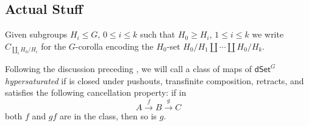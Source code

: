 \documentclass[a4paper,10pt,draft]{article}%
\numberwithin{equation}{section}%
\begin{document}

\subsection{Actual Stuff}


\begin{notation}
Given subgroups $H_i \leq G$, $0\leq i \leq k$ such that
$H_0 \geq H_i$, $1 \leq i \leq k$ we write
$C_{\amalg_i H_0/H_i}$ for the $G$-corolla encoding the 
$H_0$-set $H_0/H_1 \amalg \cdots \amalg H_0/H_k$.
\end{notation}


Following the discussion preceding \cite[Prop. 3.6.8]{HHM16}, we will call a class of maps of $\mathsf{dSet}^G$ \textit{hypersaturated} if is closed under pushouts, transfinite composition, retracts, and satisfies the following cancellation property: if in
\[
A \xrightarrow{f} B \xrightarrow{g} C
\]
both $f$ and $gf$ are in the class, then so is $g$.
\end{document}
